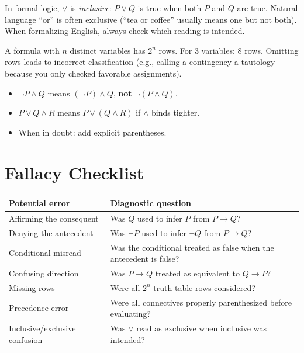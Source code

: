 \begin{remark}\label{rem:or-error}
In formal logic, $\vee$ is \emph{inclusive}: $P \vee Q$ is true when both
$P$ and $Q$ are true. Natural language ``or'' is often exclusive (``tea or
coffee'' usually means one but not both). When formalizing English, always
check which reading is intended.
\end{remark}

\begin{remark}\label{rem:rows-error}
A formula with $n$ distinct variables has $2^n$ rows. For 3 variables: 8 rows.
Omitting rows leads to incorrect classification (e.g., calling a contingency a
tautology because you only checked favorable assignments).
\end{remark}

\begin{remark}\label{rem:prec-error}
\begin{itemize}
  \item $\neg P \wedge Q$ means $(\neg P) \wedge Q$, \textbf{not} $\neg(P \wedge Q)$.
  \item $P \vee Q \wedge R$ means $P \vee (Q \wedge R)$ if $\wedge$ binds tighter.
  \item When in doubt: add explicit parentheses.
\end{itemize}
\end{remark}

\section*{Fallacy Checklist}

\begin{center}
\renewcommand{\arraystretch}{1.4}
\begin{tabular}{p{4.5cm} p{8.5cm}}
\toprule
\textbf{Potential error} & \textbf{Diagnostic question} \\
\midrule
Affirming the consequent & Was $Q$ used to infer $P$ from $P \rightarrow Q$? \\
Denying the antecedent & Was $\neg P$ used to infer $\neg Q$ from $P \rightarrow Q$? \\
Conditional misread & Was the conditional treated as false when the antecedent is false? \\
Confusing direction & Was $P \rightarrow Q$ treated as equivalent to $Q \rightarrow P$? \\
Missing rows & Were all $2^n$ truth-table rows considered? \\
Precedence error & Were all connectives properly parenthesized before evaluating? \\
Inclusive/exclusive confusion & Was $\vee$ read as exclusive when inclusive was intended? \\
\bottomrule
\end{tabular}
\end{center}
